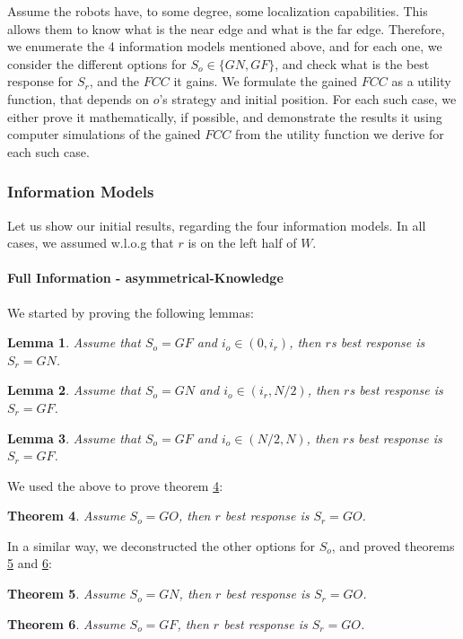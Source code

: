 \documentclass[a4paper,english,10pt]{article}
\newtheorem{theorem}{Theorem}[section]
\newtheorem{lemma}[theorem]{Lemma}
\newcommand\rob{\ensuremath{r}\xspace}
\newcommand\opp{\ensuremath{o}\xspace}
\newcommand{\w}{\ensuremath{W}\xspace}
\newcommand{\fcc}{\ensuremath{FCC}\xspace}
\newcommand{\gn}{\ensuremath{GN}\xspace}
\newcommand{\gf}{\ensuremath{GF}\xspace}
\newcommand{\go}{\ensuremath{GO}\xspace}
\begin{document}
Assume the robots have, to some degree, some localization capabilities. This allows them to know what is the near edge and what is the far edge.
Therefore, we enumerate the 4 information models mentioned above, and for each one, we consider the different options for $S_\opp\in \lbrace \gn,\gf\rbrace$, and check what is the best response for $S_\rob$, and the \fcc it gains. We formulate the gained \fcc as a utility function, that depends on \opp's strategy and initial position.
For each such case, we either prove it mathematically, if possible, and demonstrate the results it using computer simulations of the gained \fcc from the utility function we derive for each such case.


\subsubsection{Information Models}
Let us show our initial results, regarding the four information models. In all cases, we assumed w.l.o.g that \rob is on the left half of \w.
\paragraph{Full Information - asymmetrical-Knowledge}
We started by proving the following lemmas:
\begin{lemma}
Assume that $ S_\opp=\gf$ and $i_\opp \in (0,i_\rob)$, then {\rob}s best response is $S_\rob=\gn$.
\end{lemma}
\begin{lemma}
Assume that $ S_\opp=\gn$ and $i_\opp \in (i_\rob, N/2)$, then {\rob}s best response is $S_\rob=\gf$.
\end{lemma}
\begin{lemma}
Assume that $ S_\opp=\gf$ and $i_\opp \in (N/2,N)$, then {\rob}s best response is $S_\rob=\gf$.
\end{lemma}
We used the above to prove theorem \ref{theorems: 1d full info asym So=go}:
\begin{theorem} \label{theorems: 1d full info asym So=go}
Assume $S_\opp=\go$, then \rob best response is $S_\rob=\go$. 
\end{theorem}

In a similar way, we deconstructed the other options for $S_\opp$, and proved theorems \ref{theorems: 1d full info asym So=gn} and \ref{theorems: 1d full info asym So=gf}:
\begin{theorem} \label{theorems: 1d full info asym So=gn}
Assume $S_\opp=\gn$, then \rob best response is $S_\rob=\go$.
\end{theorem}
\begin{theorem} \label{theorems: 1d full info asym So=gf}
Assume $S_\opp=\gf$, then \rob best response is $S_\rob=\go$.
\end{theorem}
\end{document}

